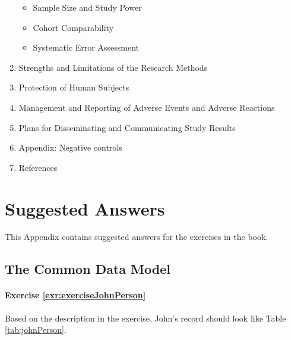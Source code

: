 \documentclass[11pt]{book}
\providecommand{\tightlist}{%
  \setlength{\itemsep}{0pt}\setlength{\parskip}{0pt}}
\theoremstyle{definition}
\theoremstyle{definition}
\theoremstyle{definition}
\theoremstyle{remark}
\begin{document}
\begin{enumerate}
  \begin{itemize}
  \tightlist
  \item
    Sample Size and Study Power\\
  \item
    Cohort Comparability\\
  \item
    Systematic Error Assessment\\
  \end{itemize}
\item
  Strengths and Limitations of the Research Methods\\
\item
  Protection of Human Subjects\\
\item
  Management and Reporting of Adverse Events and Adverse Reactions\\
\item
  Plans for Disseminating and Communicating Study Results
\item
  Appendix: Negative controls
\item
  References
\end{enumerate}

\hypertarget{SuggestedAnswers}{%
\chapter{Suggested Answers}\label{SuggestedAnswers}}

This Appendix contains suggested answers for the exercises in the book.

\hypertarget{Cdmanswers}{%
\section{The Common Data Model}\label{Cdmanswers}}

\hypertarget{exercise-refexrexercisejohnperson}{%
\subsubsection*{Exercise \ref{exr:exerciseJohnPerson}}\label{exercise-refexrexercisejohnperson}}

Based on the description in the exercise, John's record should look like Table \ref{tab:johnPerson}.
\end{document}
